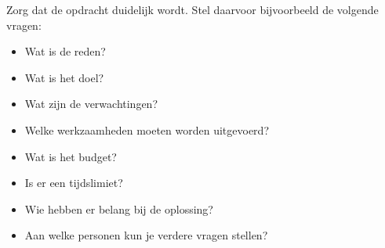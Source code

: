 Zorg dat de opdracht duidelijk wordt. Stel daarvoor bijvoorbeeld de volgende vragen:
\begin{itemize}
\item Wat is de reden?
\item Wat is het doel?
\item Wat zijn de verwachtingen?
\item Welke werkzaamheden moeten worden uitgevoerd?
\item Wat is het budget?
\item Is er een tijdslimiet?
\item Wie hebben er belang bij de oplossing?
\item Aan welke personen kun je verdere vragen stellen?
\end{itemize}

